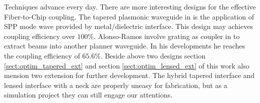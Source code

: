 Techniques advance every day. There are more interesting designs for the effective Fiber-to-Chip coupling. The tapered plasmonic waveguide in \cite{tapered_plasmonic_waveguides} is the application of SPP mode wave provided by metal/dielectric interface. This design may achieves coupling efficiency over $100\%$. Alonso-Ramos involve grating as coupler in \cite{fiber_to_chip_grating_waveguides}  to extract beams into another planner waveguide. In his developments he reaches the coupling efficiency of $65.6\%$. Beside above two designs section \ref{sect:optim_tapered_ext} and section \ref{sect:optim_lensed_ext} of this work also mension two extension for further development. The hybrid tapered interface and lensed interface with a neck are properly uneasy for fabrication, but as a simulation project they can still engage our attentions.
